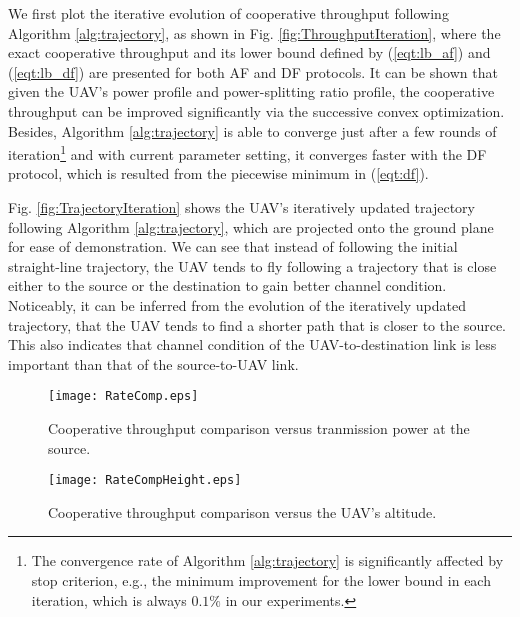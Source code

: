 \documentclass[12pt, draftclsnofoot, onecolumn]{IEEEtran}
\begin{document}
We first plot the iterative evolution of cooperative throughput following Algorithm \ref{alg:trajectory}, as shown in Fig. \ref{fig:ThroughputIteration}, where the exact cooperative throughput and its lower bound defined by (\ref{eqt:lb_af}) and (\ref{eqt:lb_df}) are presented for both AF and DF protocols. It can be shown that given the UAV's power profile and power-splitting ratio profile, the cooperative throughput can be improved significantly via the successive convex optimization. Besides, Algorithm \ref{alg:trajectory} is able to converge just after a few rounds of iteration\footnote{The convergence rate of Algorithm \ref{alg:trajectory} is significantly affected by stop criterion, e.g., the minimum improvement for the lower bound in each iteration, which is always $0.1\%$ in our experiments.} and with current parameter setting, it converges faster with the DF protocol, which is resulted from the piecewise minimum in (\ref{eqt:df}).

Fig. \ref{fig:TrajectoryIteration} shows the UAV's iteratively updated trajectory following Algorithm \ref{alg:trajectory}, which are projected onto the ground plane for ease of demonstration. We can see that instead of following the initial straight-line trajectory, the UAV tends to fly following a trajectory that is close either to the source or the destination to gain better channel condition. Noticeably, it can be inferred from the evolution of the iteratively updated trajectory, that the UAV tends to find a shorter path that is closer to the source. This also indicates that channel condition of the UAV-to-destination link is less important than that of the source-to-UAV link.

\def\2Win{4.3in}
\begin{figure*}
\centering
\begin{minipage}[t]{\2Win}
\texttt{[image: RateComp.eps]}
\caption{Cooperative throughput comparison versus tranmission power at the source.}
\label{fig:RateComp}
\end{minipage}
\begin{minipage}[t]{\2Win}
\texttt{[image: RateCompHeight.eps]}
\caption{Cooperative throughput comparison versus the UAV's altitude.}
\label{fig:RateCompHeight}
\end{minipage}
\end{figure*}
\end{document}
